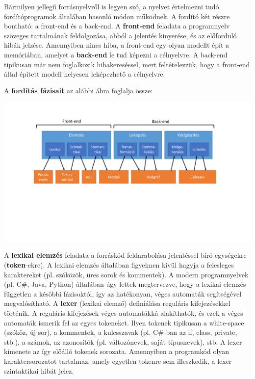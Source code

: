 \documentclass[12pt, a4paper]{report}
\newcommand{\bb}[1]{\textbf{#1}}
\begin{document}
Bármilyen jellegű forrásnyelvről is legyen szó, a nyelvet értelmezni tudó fordítóprogramok általában hasonló módon működnek. A fordító két részre bontható: a front-end és a back-end. A \bb{front-end} feladata a programnyelv szöveges tartalmának feldolgozása, abból a jelentés kinyerése, és az előforduló hibák jelzése. Amennyiben nincs hiba, a front-end egy olyan modellt épít a memóriában, amelyet a \bb{back-end} le tud képezni a célnyelvre. A back-end tipikusan már nem foglalkozik hibakereséssel, mert feltételezzük, hogy a front-end által épített modell helyesen leképezhető a célnyelvre.

A \bb{fordítás fázisait} az alábbi ábra foglalja össze:

\begin{center}\includegraphics[trim=110 220 120 60,clip,width=\textwidth,page=1]{Images.pdf}\end{center}

A \bb{lexikai elemzés} feladata a forráskód feldarabolása jelentéssel bíró egységekre (\bb{token}-ekre). A lexikai elemzés általában figyelmen kívül hagyja a felesleges karaktereket (pl. szóközök, üres sorok és kommentek). A modern programnyelvek (pl. C\#, Java, Python) általában úgy lettek megtervezve, hogy a lexikai elemzés független a későbbi fázisoktól, így az hatékonyan, véges automaták segítségével megvalósítható. A \bb{lexer} (lexikai elemző) definiálása reguláris kifejezésekkel történik. A reguláris kifejezések véges automatákká alakíthatók, és ezek a véges automaták ismerik fel az egyes tokeneket. Ilyen tokenek tipikusan a white-space (szóköz, új sor), a kommentek, a kulcsszavak (pl. C\#-ban az if, class, private, stb.), a számok, az azonosítók (pl. változónevek, saját típusnevek), stb. A lexer kimenete az így előálló tokenek sorozata. Amennyiben a programkód olyan karaktersorozatot tartalmaz, amely egyetlen tokenre sem illeszkedik, a lexer szintaktikai hibát jelez.
\end{document}
